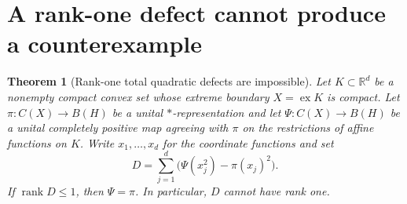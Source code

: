 \documentclass[11pt,letterpaper]{amsart}
\newtheorem{theorem}{Theorem}[section]
\theoremstyle{definition}
\theoremstyle{remark}
\numberwithin{equation}{section}
\DeclareMathOperator{\rank}{rank}
\newcommand{\R}{\mathbb R}
\begin{document}
\section{A rank-one defect cannot produce a counterexample}

\begin{theorem}[Rank-one total quadratic defects are impossible]
\label{rankone:thm}
Let $K\subset\R^d$ be a nonempty compact convex set whose extreme
boundary $X=\operatorname{ex}K$ is compact. Let
$\pi:C(X)\to B(H)$ be a unital $*$-representation and let
$\Psi:C(X)\to B(H)$ be a unital completely positive map agreeing
with $\pi$ on the restrictions of affine functions on $K$.
Write $x_1,\ldots,x_d$ for the coordinate functions and set
\[
 D=\sum_{j=1}^d\bigl(\Psi(x_j^2)-\pi(x_j)^2\bigr).
\]
If $\rank D\le1$, then $\Psi=\pi$. In particular, $D$ cannot have
rank one.
\end{theorem}
\end{document}
